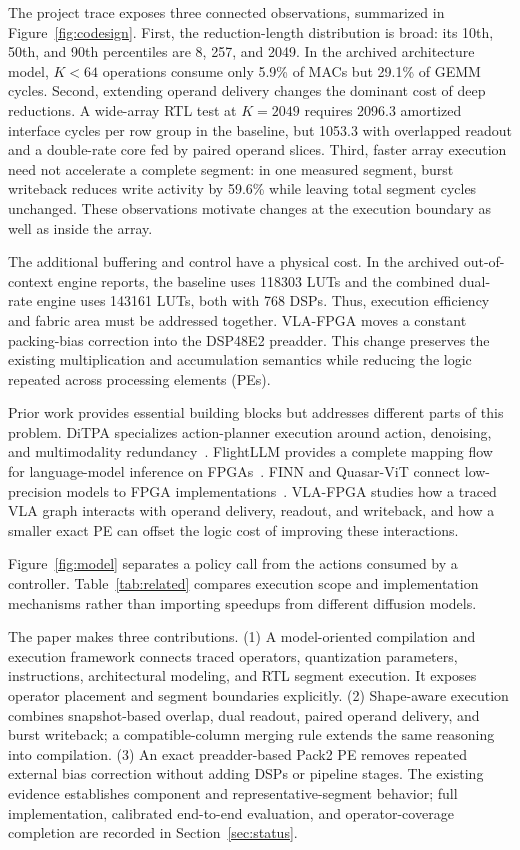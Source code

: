 \documentclass[10pt,conference,letterpaper]{IEEEtran}
\begin{document}
The project trace exposes three connected observations, summarized in Figure~\ref{fig:codesign}. First, the reduction-length distribution is broad: its 10th, 50th, and 90th percentiles are 8, 257, and 2049. In the archived architecture model, $K<64$ operations consume only 5.9\% of MACs but 29.1\% of GEMM cycles. Second, extending operand delivery changes the dominant cost of deep reductions. A wide-array RTL test at $K=2049$ requires 2096.3 amortized interface cycles per row group in the baseline, but 1053.3 with overlapped readout and a double-rate core fed by paired operand slices. Third, faster array execution need not accelerate a complete segment: in one measured segment, burst writeback reduces write activity by 59.6\% while leaving total segment cycles unchanged. These observations motivate changes at the execution boundary as well as inside the array.

The additional buffering and control have a physical cost. In the archived out-of-context engine reports, the baseline uses 118303 LUTs and the combined dual-rate engine uses 143161 LUTs, both with 768 DSPs. Thus, execution efficiency and fabric area must be addressed together. VLA-FPGA moves a constant packing-bias correction into the DSP48E2 preadder. This change preserves the existing multiplication and accumulation semantics while reducing the logic repeated across processing elements (PEs).

Prior work provides essential building blocks but addresses different parts of this problem. DiTPA specializes action-planner execution around action, denoising, and multimodality redundancy~\cite{ditpa}. FlightLLM provides a complete mapping flow for language-model inference on FPGAs~\cite{flight}. FINN and Quasar-ViT connect low-precision models to FPGA implementations~\cite{finn,quasar}. VLA-FPGA studies how a traced VLA graph interacts with operand delivery, readout, and writeback, and how a smaller exact PE can offset the logic cost of improving these interactions.

Figure~\ref{fig:model} separates a policy call from the actions consumed by a controller. Table~\ref{tab:related} compares execution scope and implementation mechanisms rather than importing speedups from different diffusion models.

The paper makes three contributions. (1) A model-oriented compilation and execution framework connects traced operators, quantization parameters, instructions, architectural modeling, and RTL segment execution. It exposes operator placement and segment boundaries explicitly. (2) Shape-aware execution combines snapshot-based overlap, dual readout, paired operand delivery, and burst writeback; a compatible-column merging rule extends the same reasoning into compilation. (3) An exact preadder-based Pack2 PE removes repeated external bias correction without adding DSPs or pipeline stages. The existing evidence establishes component and representative-segment behavior; full implementation, calibrated end-to-end evaluation, and operator-coverage completion are recorded in Section~\ref{sec:status}.
\end{document}
